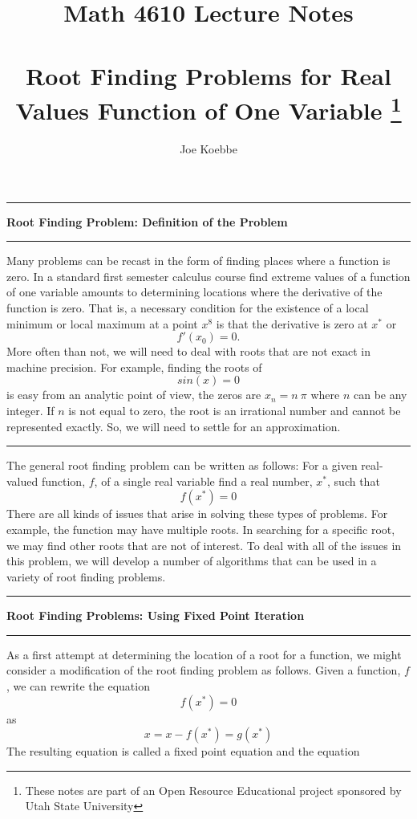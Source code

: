 \documentclass[10pt,fleqn]{article}
\title{Math 4610 Lecture Notes \\
            \ \\
      Root Finding Problems for Real Values Function of One Variable
  \footnote{These notes are part of an Open Resource Educational project
            sponsored by Utah State University}}
\author{Joe Koebbe}
\begin{document}
\maketitle
\newpage
\vskip0.1in\hrule\vskip0.1in
\noindent
{\bf Root Finding Problem: Definition of the Problem} 
\vskip0.1in\hrule\vskip0.1in
\noindent
Many problems can be recast in the form of finding places where a function is
zero. In a standard first semester calculus course find extreme values of a
function of one variable amounts to determining locations where the derivative
of the function is zero. That is, a necessary condition for the existence of a
local minimum or local maximum at a point $x^8$ is that the derivative is zero
at $x^*$ or
$$
  f'(x_0)=0.
$$
More often than not, we will need to deal with roots that are not exact in
machine precision. For example, finding the roots of
$$
  sin(x)=0
$$
is easy from an analytic point of view, the zeros are $x_n=n\ \pi$ where $n$ can
be any integer. If $n$ is not equal to zero, the root is an irrational number
and cannot be represented exactly. So, we will need to settle for an
approximation.
\vskip0.1in\hrule\vskip0.1in
\noindent
The general root finding problem can be written as follows: For a given
real-valued function, $f$, of a single real variable find a real number, $x^*$,
such that
$$
  f(x^*) = 0
$$
There are all kinds of issues that arise in solving these types of problems.
For example, the function may have multiple roots. In searching for a specific
root, we may find other roots that are not of interest. To deal with all of the
issues in this problem, we will develop a number of algorithms that can be used
in a variety of root finding problems.
\vskip0.1in\hrule\vskip0.1in
\noindent
{\bf Root Finding Problems: Using Fixed Point Iteration} 
\vskip0.1in\hrule\vskip0.1in
\noindent
As a first attempt at determining the location of a root for a function, we
might consider a modification of the root finding problem as follows. Given a
function, $f$, we can rewrite the equation
$$
  f(x^*) = 0
$$
as
$$
  x = x - f(x^*) = g(x^*)
$$
The resulting equation is called a fixed point equation and the equation
\end{document}
